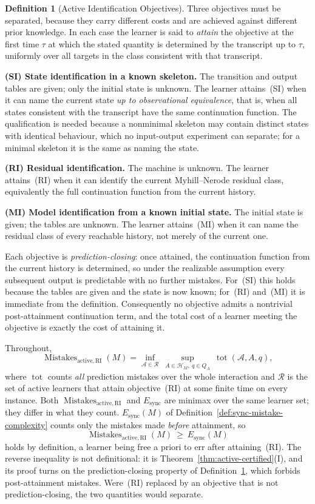\documentclass[12pt]{article}
\theoremstyle{definition}
\newtheorem{definition}[theorem]{Definition}
\newcommand{\Esync}{E_{\mathrm{sync}}}
\newcommand{\MistRI}{\operatorname{Mistakes}_{\mathrm{active,RI}}}
\begin{document}
\begin{definition}[Active Identification Objectives]
\label{def:residual-knowledge}
Three objectives must be separated, because they carry different costs and are
achieved against different prior knowledge.  In each case the learner is said
to \emph{attain} the objective at the first time $\tau$ at which the stated
quantity is determined by the transcript up to $\tau$, uniformly over all
targets in the class consistent with that transcript.

\textbf{(SI) State identification in a known skeleton.}  The transition and
output tables are given; only the initial state is unknown.  The learner
attains~(SI) when it can name the current state \emph{up to observational
equivalence}, that is, when all states consistent with the transcript have the
same continuation function.  The qualification is needed because a nonminimal
skeleton may contain distinct states with identical behaviour, which no
input-output experiment can separate; for a minimal skeleton it is the same as
naming the state.

\textbf{(RI) Residual identification.}  The machine is unknown.  The learner
attains~(RI) when it can identify the current Myhill--Nerode residual class,
equivalently the full continuation function from the current history.

\textbf{(MI) Model identification from a known initial state.}  The initial
state is given; the tables are unknown.  The learner attains~(MI) when it can
name the residual class of every reachable history, not merely of the current
one.

Each objective is \emph{prediction-closing}: once attained, the continuation
function from the current history is determined, so under the realizable
assumption every subsequent output is predictable with no further mistakes.
For~(SI) this holds because the tables are given and the state is now known;
for~(RI) and~(MI) it is immediate from the definition.  Consequently no
objective admits a nontrivial post-attainment continuation term, and the total
cost of a learner meeting the objective is exactly the cost of attaining it.

Throughout,
\[
\MistRI(M)
=
\inf_{\mathcal A\in\mathcal R}\
\sup_{A\in\mathcal H_M,\ q\in Q_A}\
\operatorname{tot}(\mathcal A,A,q),
\]
where $\operatorname{tot}$ counts \emph{all} prediction mistakes over the whole
interaction and $\mathcal R$ is the set of active learners that attain
objective~(RI) at some finite time on every instance.  Both $\MistRI$ and
$\Esync$ are minimax over the same learner set; they differ in what they count.
$\Esync(M)$ of Definition~\ref{def:sync-mistake-complexity} counts only the
mistakes made \emph{before} attainment, so
\[
\MistRI(M)\ \ge\ \Esync(M)
\]
holds by definition, a learner being free a priori to err after attaining~(RI).
The reverse inequality is not definitional: it is
Theorem~\ref{thm:active-certified}(I), and its proof turns on the
prediction-closing property of Definition~\ref{def:residual-knowledge}, which
forbids post-attainment mistakes.  Were~(RI) replaced by an objective that is
not prediction-closing, the two quantities would separate.


\end{definition}
\end{document}
